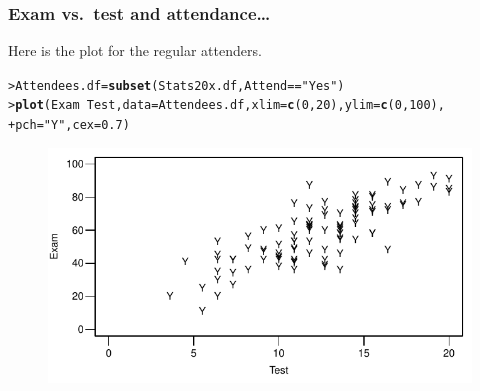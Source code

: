 \documentclass{beamer}\usepackage[]{graphicx}\usepackage[]{xcolor}
\makeatletter
\newcommand{\hlnum}[1]{\textcolor[rgb]{0.686,0.059,0.569}{#1}}%
\newcommand{\hlstr}[1]{\textcolor[rgb]{0.192,0.494,0.8}{#1}}%
\newcommand{\hlopt}[1]{\textcolor[rgb]{0,0,0}{#1}}%
\newcommand{\hlstd}[1]{\textcolor[rgb]{0.345,0.345,0.345}{#1}}%
\newcommand{\hlkwb}[1]{\textcolor[rgb]{0.69,0.353,0.396}{#1}}%
\newcommand{\hlkwc}[1]{\textcolor[rgb]{0.333,0.667,0.333}{#1}}%
\newcommand{\hlkwd}[1]{\textcolor[rgb]{0.737,0.353,0.396}{\textbf{#1}}}%
\newenvironment{kframe}{%
 \def\at@end@of@kframe{}%
 \ifinner\ifhmode%
  \def\at@end@of@kframe{\end{minipage}}%
  \begin{minipage}{\columnwidth}%
 \fi\fi%
 \def\FrameCommand##1{\hskip\@totalleftmargin \hskip-\fboxsep
 \colorbox{shadecolor}{##1}\hskip-\fboxsep
     \hskip-\linewidth \hskip-\@totalleftmargin \hskip\columnwidth}%
 \MakeFramed {\advance\hsize-\width
   \@totalleftmargin\z@ \linewidth\hsize
   \@setminipage}}%
 {\par\unskip\endMakeFramed%
 \at@end@of@kframe}
\newenvironment{knitrout}{}{} %
\makeatother
\begin{document}
\begin{frame}[fragile]
\frametitle{Exam vs.\ test \textbf{and} attendance\ldots}

Here is the plot for the regular attenders.

\begin{knitrout}\scriptsize
{}\color{fgcolor}\begin{kframe}
\begin{alltt}
\hlstd{> }\hlstd{Attendees.df} \hlkwb{=} \hlkwd{subset}\hlstd{(Stats20x.df, Attend} \hlopt{==} \hlstr{"Yes"}\hlstd{)}
\hlstd{> }\hlkwd{plot}\hlstd{(Exam} \hlopt{~} \hlstd{Test,} \hlkwc{data} \hlstd{= Attendees.df,} \hlkwc{xlim} \hlstd{=} \hlkwd{c}\hlstd{(}\hlnum{0}\hlstd{,} \hlnum{20}\hlstd{),} \hlkwc{ylim} \hlstd{=} \hlkwd{c}\hlstd{(}\hlnum{0}\hlstd{,} \hlnum{100}\hlstd{),}
\hlstd{+ }     \hlkwc{pch} \hlstd{=} \hlstr{"Y"}\hlstd{,} \hlkwc{cex} \hlstd{=} \hlnum{0.7}\hlstd{)}
\end{alltt}
\end{kframe}
\end{knitrout}



\begin{figure}
  \centering
  \includegraphics{figure/RC-H08-004}
\end{figure}

\end{frame}
\end{document}
